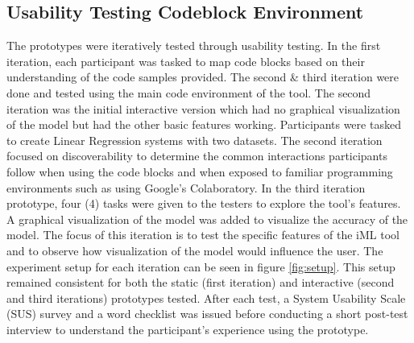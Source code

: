 \documentclass{sigchi-ext}
\begin{document}
\subsection{Usability Testing Codeblock Environment}
The prototypes were iteratively tested through usability testing. In the first iteration, each participant was tasked to map code blocks based on their understanding of the code samples provided. The second \& third iteration were done and tested using the main code environment of the tool. The second iteration was the initial interactive version which had no graphical visualization of the model but had the other basic features working. 
Participants were tasked to create Linear Regression systems with two datasets. The second iteration focused on discoverability to determine the common interactions participants follow when using the code blocks and when exposed to familiar programming environments such as using Google's Colaboratory. 
In the third iteration prototype, four (4) tasks were given to the testers to explore the tool's features. A graphical visualization of the model was added to visualize the accuracy of the model. The focus of this iteration is to test the specific features of the iML tool and to observe how visualization of the model would influence the user. The experiment setup for each iteration can be seen in figure \ref{fig:setup}. This setup remained consistent for both the static (first iteration) and interactive (second and third iterations) prototypes tested. 
After each test, a System Usability Scale (SUS) survey and a word checklist was issued before conducting a short post-test interview to understand the participant's experience using the prototype. 
\end{document}
